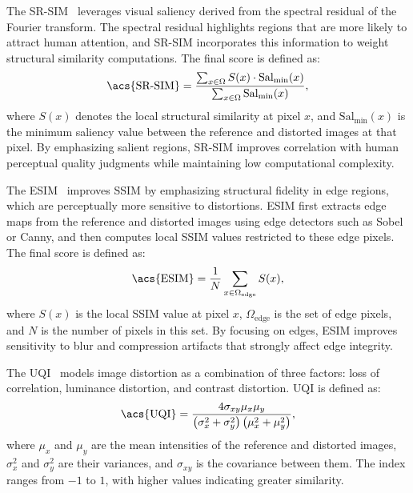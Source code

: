 The \acf{SR-SIM}~\cite{zhang2012srsim} leverages visual saliency derived from the spectral residual of the Fourier transform. The spectral residual highlights regions that are more likely to attract human attention, and \acs{SR-SIM} incorporates this information to weight structural similarity computations. The final score is defined as:
\begin{equation}
\text{\acs{SR-SIM}} = \frac{\sum_{x \in \Omega} S(x) \cdot \text{Sal}_{\min}(x)}{\sum_{x \in \Omega} \text{Sal}_{\min}(x)},
\end{equation}
where $S(x)$ denotes the local structural similarity at pixel $x$, and $\text{Sal}_{\min}(x)$ is the minimum saliency value between the reference and distorted images at that pixel. By emphasizing salient regions, \acs{SR-SIM} improves correlation with human perceptual quality judgments while maintaining low computational complexity.

The \acf{ESIM}~\cite{chen2006esim} improves \acs{SSIM} by emphasizing structural fidelity in edge regions, which are perceptually more sensitive to distortions. \acs{ESIM} first extracts edge maps from the reference and distorted images using edge detectors such as Sobel or Canny, and then computes local \acs{SSIM} values restricted to these edge pixels. The final score is defined as:
\begin{equation}
\text{\acs{ESIM}} = \frac{1}{N} \sum_{x \in \Omega_{\text{edge}}} S(x),
\end{equation}
where $S(x)$ is the local \acs{SSIM} value at pixel $x$, $\Omega_{\text{edge}}$ is the set of edge pixels, and $N$ is the number of pixels in this set. By focusing on edges, \acs{ESIM} improves sensitivity to blur and compression artifacts that strongly affect edge integrity.

The \acf{UQI}~\cite{wang2002uqi} models image distortion as a combination of three factors: loss of correlation, luminance distortion, and contrast distortion. \acs{UQI} is defined as:
\begin{equation}
\text{\acs{UQI}} = \frac{4 \sigma_{xy} \mu_x \mu_y}{\left( \sigma_x^2 + \sigma_y^2 \right)\left( \mu_x^2 + \mu_y^2 \right)},
\end{equation}
where $\mu_x$ and $\mu_y$ are the mean intensities of the reference and distorted images, $\sigma_x^2$ and $\sigma_y^2$ are their variances, and $\sigma_{xy}$ is the covariance between them. The index ranges from $-1$ to $1$, with higher values indicating greater similarity.

